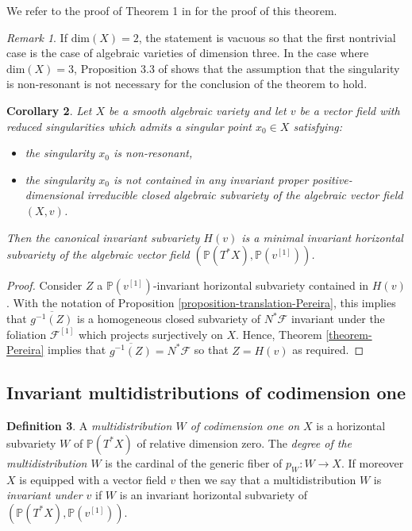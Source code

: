 \documentclass[12pt]{amsart}
\renewcommand{\P}{\mathbb{P}}
\theoremstyle{definition}
\newtheorem{definition}{Definition}[subsection]
\theoremstyle{plain}
\newtheorem{corollary}[definition]{Corollary}
\theoremstyle{exampstyle}
\theoremstyle{exampstyle}\newtheorem{thmxbis}{Theorem}
\numberwithin{equation}{section}
\theoremstyle{remark}
\newtheorem{remark}[definition]{Remark}
\begin{document}
We refer to the proof of Theorem 1 in \cite{Pereira-JEMS} for the proof of this theorem.

\begin{remark} \label{remark-dimension3}
If $\mathrm{dim}(X) = 2$, the statement is vacuous so that the first nontrivial case is the case of algebraic varieties of dimension three. In the case where $\mathrm{dim}(X) = 3$, Proposition 3.3 of \cite{Pereira-JEMS} shows that the assumption that the singularity is non-resonant is not necessary for the conclusion of the theorem to hold.   
\end{remark} 

\begin{corollary} \label{corollary-Pereira}
Let $X$ be a smooth algebraic variety and let $v$ be a vector field with reduced singularities which admits a singular point $x_0 \in X$ satisfying:
\begin{itemize}
\item[(a)] the singularity $x_0$ is non-resonant, 
\item[(b)] the singularity $x_0$ is not contained in any invariant proper positive-dimensional irreducible closed algebraic subvariety of the algebraic vector field $(X,v)$.
\end{itemize}
Then the canonical invariant subvariety $H(v)$ is a {\em minimal  invariant horizontal} subvariety of the algebraic vector field $(\P(T^\ast X), \P(v^{[1]}))$.
\end{corollary}


\begin{proof} 
Consider $Z$ a $\P(v^{[1]})$-invariant horizontal subvariety  contained in $H(v)$. With the notation of Proposition \ref{proposition-translation-Pereira}, this implies that 
$\overline{g^{-1}(Z)}$ is a homogeneous closed subvariety of  $N^\ast \mathcal F$ invariant under the foliation $\mathcal F^{[1]}$ which projects surjectively on $X$. Hence, Theorem \ref{theorem-Pereira} implies that $\overline{g^{-1}(Z)} = N^\ast \mathcal F$ so that $Z = H(v)$  as required. 
\end{proof} 

\subsection{Invariant multidistributions of codimension one} 




\begin{definition} 
A {\em{multidistribution $W$ of codimension one  on $X$}} is a horizontal subvariety $W$ of $\P(T^\ast X)$ of relative dimension zero. The {\em{degree of the multidistribution $W$}} is the cardinal of the generic fiber of 
$ p_W : W \rightarrow X$.
If moreover $X$ is equipped with a vector field $v$ then we say that a multidistribution $W$ is {\em invariant under $v$} if $W$ is an invariant horizontal  subvariety of $(\P(T^\ast X), \P(v^{[1]}))$. 
\end{definition} 
\end{document}
